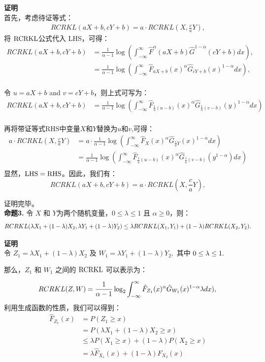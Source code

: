 \textbf{证明}\\
首先，考虑待证等式：
\begin{align*}
RCRKL(aX+b,cY+b)=a\cdot RCRKL(X,\frac{c}{a}Y),
\end{align*}
将 $\rm{RCRKL}$公式代入 LHS，可得：
\begin{align*}
RCRKL(aX+b,cY+b) &=\frac{1}{\alpha-1} \log \left(\int_{-\infty}^{\infty}\hat F^{\alpha}(aX+b)\hat G^{1-\alpha}(cY+b)dx \right),\\
&= \frac{1}{\alpha-1} \log \left(\int_{-\infty}^{\infty}\hat F_{aX+b}(x)^{\alpha} \hat G_{cY+b}(x )^{1-\alpha}dx \right),\\
\end{align*}

令 $u=aX+b$ and $v=cY+b$，则上式可写为：
\begin{align*}
RCRKL(aX+b,cY+b) &=\frac{1}{\alpha-1} \log \left(\int_{-\infty}^{\infty}\hat F_{\frac{1}{a}(u-b)}(x)^{\alpha}\hat G_{\frac{1}{a}(v-b)}(y)^{1-\alpha}dx \right)\\
\end{align*}

再将带证等式RHS中变量$X$和$Y$替换为$u$和$v$,可得：
\begin{align*}
a\cdot RCRKL(X,\frac{c}{a}Y) &=a\cdot \frac{1}{\alpha-1} \log \left(\int_{-\infty}^{\infty}\hat F_{X}(x)^{\alpha}\hat G_{\frac{c}{a}Y}(x)^{1-\alpha}dx \right)\\
&=\frac{1}{\alpha-1} \log \left(\int_{-\infty}^{\infty}\hat F_{\frac{1}{a}(u-b)}(x)^{\alpha}\hat G_{\frac{1}{a}(v-b)}(y^{1-\alpha})dx \right)\\
\end{align*}
显然，$\rm{LHS}=\rm{RHS}$。因此，我们有：
$$RCRKL(aX+b,cY+b)=a\cdot RCRKL(X,\frac{c}{a}Y), $$

证明完毕。\\

\textbf{命题3.} 令 $X$ 和 $Y$为两个随机变量，$0\leq \lambda \leq 1$ 且 $\alpha \geq 0$，则：$$RCRKL(\lambda X_{1}+(1-\lambda) X_{2}, \lambda Y_{1}+(1-\lambda)Y_{2}) \leq \lambda RCRKL(X_{1},Y_{1})+(1-\lambda) RCRKL(X_{2},Y_{2}).\\$$

\textbf{证明}\\
令 $Z_{1}=\lambda X_{1}+(1-\lambda) X_{2}$ 及 $W_{1}=\lambda Y_{1}+(1-\lambda)Y_{2},$ 其中 $0\leq \lambda \leq 1.\\$

那么，$Z_{1}$ 和 $W_{1}$ 之间的 $\rm{RCRKL}$ 可以表示为：

$$RCRKL(Z,W) = \frac{1}{\alpha-1}\log_{2}\int_{-\infty}^{\infty} \hat F_{Z_{1}}(x)^{\alpha} \hat G_{W_{1}}(x)^{1-\alpha} \lambda dx),\\$$
利用生成函数的性质，我们可以得到：
\begin{align*}
\hat F_{Z_{1}}(x) &= P(Z_{1} \geq x)\\
&= P(\lambda X_{1}+(1-\lambda) X_{2}\geq x)\\
&\leq \lambda P(X_{1}\geq x)+ (1-\lambda) P(X_{2}\geq x)\\
&= \lambda \hat F_{X_{1}}(x)+ (1-\lambda) \hat F_{X_{2}}(x)
\end{align*}

